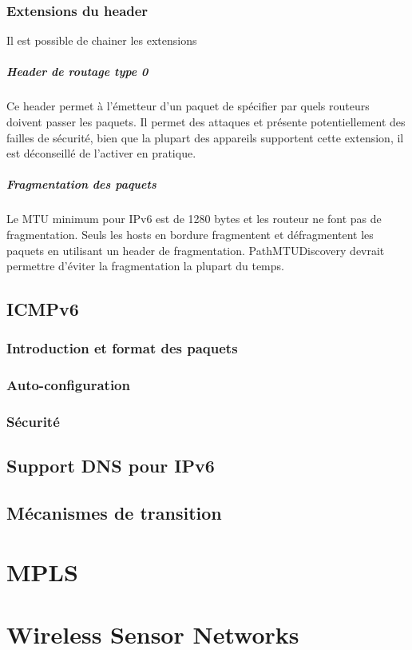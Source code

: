 \documentclass{report}
\begin{document}
\subsection{Extensions du header}

Il est possible de chainer les extensions

\paragraph{Header de routage type 0}

Ce header permet à l'émetteur d'un paquet de spécifier par quels
routeurs doivent passer les paquets. Il permet des attaques et
présente potentiellement des failles de sécurité, bien que la plupart
des appareils supportent cette extension, il est déconseillé de
l'activer en pratique.

\paragraph{Fragmentation des paquets}

Le MTU minimum pour IPv6 est de 1280 bytes et les routeur ne font pas
de fragmentation. Seuls les hosts en bordure fragmentent et
défragmentent les paquets en utilisant un header de
fragmentation. PathMTUDiscovery devrait permettre d'éviter la
fragmentation la plupart du temps.

\section{ICMPv6}

\subsection{Introduction et format des paquets}

\subsection{Auto-configuration}

\subsection{Sécurité}

\section{Support DNS pour IPv6}

\section{Mécanismes de transition}

\chapter{MPLS}

\chapter{Wireless Sensor Networks}
\end{document}
